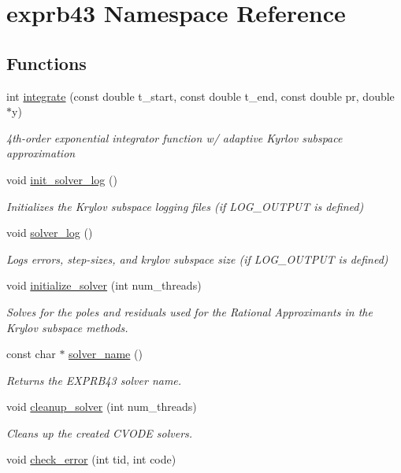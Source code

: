 \hypertarget{namespaceexprb43}{}\section{exprb43 Namespace Reference}
\label{namespaceexprb43}
\subsection*{Functions}
\begin{DoxyCompactItemize}
\item 
int \hyperlink{namespaceexprb43_a67d60af836938be17821d7ca32fa31fa}{integrate} (const double t\+\_\+start, const double t\+\_\+end, const double pr, double $\ast$y)
\begin{DoxyCompactList}\small\item\em 4th-\/order exponential integrator function w/ adaptive Kyrlov subspace approximation \end{DoxyCompactList}\item 
void \hyperlink{namespaceexprb43_adb214180d920bd67592be89b6264aa90}{init\+\_\+solver\+\_\+log} ()
\begin{DoxyCompactList}\small\item\em Initializes the Krylov subspace logging files (if L\+O\+G\+\_\+\+O\+U\+T\+P\+UT is defined) \end{DoxyCompactList}\item 
void \hyperlink{namespaceexprb43_ad02d94a3cc25e03cf47a6903559f4262}{solver\+\_\+log} ()
\begin{DoxyCompactList}\small\item\em Logs errors, step-\/sizes, and krylov subspace size (if L\+O\+G\+\_\+\+O\+U\+T\+P\+UT is defined) \end{DoxyCompactList}\item 
void \hyperlink{namespaceexprb43_a923d03974bd3461619b71ac8fb34abd8}{initialize\+\_\+solver} (int num\+\_\+threads)
\begin{DoxyCompactList}\small\item\em Solves for the poles and residuals used for the Rational Approximants in the Krylov subspace methods. \end{DoxyCompactList}\item 
const char $\ast$ \hyperlink{namespaceexprb43_a5357a692b80a08edee50c4073763422b}{solver\+\_\+name} ()
\begin{DoxyCompactList}\small\item\em Returns the E\+X\+P\+R\+B43 solver name. \end{DoxyCompactList}\item 
void \hyperlink{namespaceexprb43_ad7bbc3b8b5f2627e89908cdec0750523}{cleanup\+\_\+solver} (int num\+\_\+threads)
\begin{DoxyCompactList}\small\item\em Cleans up the created C\+V\+O\+DE solvers. \end{DoxyCompactList}\item 
void \hyperlink{namespaceexprb43_aa165b73c13e21b53f0713c4c5ec5fd7c}{check\+\_\+error} (int tid, int code)
\end{DoxyCompactItemize}


